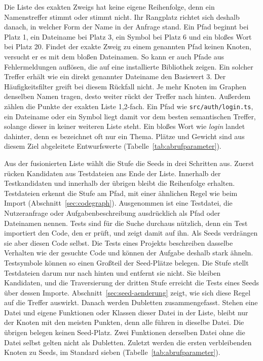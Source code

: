 Die Liste des exakten Zweigs hat keine eigene Reihenfolge, denn ein Namenstreffer stimmt oder stimmt nicht. Ihr Rangplatz richtet sich deshalb danach, in welcher Form der Name in der Anfrage stand. Ein Pfad beginnt bei Platz 1, ein Dateiname bei Platz 3, ein Symbol bei Platz 6 und ein bloßes Wort bei Platz 20. Findet der exakte Zweig zu einem genannten Pfad keinen Knoten, versucht er es mit dem bloßen Dateinamen. So kann er auch Pfade aus Fehlermeldungen auflösen, die auf eine installierte Bibliothek zeigen. Ein solcher Treffer erhält wie ein direkt genannter Dateiname den Basiswert 3. Der Häufigkeitsfilter greift bei diesem Rückfall nicht. Je mehr Knoten im Graphen denselben Namen tragen, desto weiter rückt der Treffer nach hinten. Außerdem zählen die Punkte der exakten Liste 1,2-fach. Ein Pfad wie \texttt{src/auth/login.ts}, ein Dateiname oder ein Symbol liegt damit vor dem besten semantischen Treffer, solange dieser in keiner weiteren Liste steht. Ein bloßes Wort wie \emph{login} landet dahinter, denn es bezeichnet oft nur ein Thema. Plätze und Gewicht sind aus diesem Ziel abgeleitete Entwurfswerte (Tabelle~\ref{tab:abrufparameter}).

Aus der fusionierten Liste wählt die Stufe die Seeds in drei Schritten aus. Zuerst rücken Kandidaten aus Testdateien ans Ende der Liste. Innerhalb der Testkandidaten und innerhalb der übrigen bleibt die Reihenfolge erhalten. Testdateien erkennt die Stufe am Pfad, mit einer ähnlichen Regel wie beim Import (Abschnitt~\ref{sec:codegraph}). Ausgenommen ist eine Testdatei, die Nutzeranfrage oder Aufgabenbeschreibung ausdrücklich als Pfad oder Dateinamen nennen. Tests sind für die Suche durchaus nützlich, denn ein Test importiert den Code, den er prüft, und zeigt damit auf ihn. Als Seeds verdrängen sie aber diesen Code selbst. Die Tests eines Projekts beschreiben dasselbe Verhalten wie der gesuchte Code und können der Aufgabe deshalb stark ähneln. Testsymbole können so einen Großteil der Seed-Plätze belegen. Die Stufe stellt Testdateien darum nur nach hinten und entfernt sie nicht. Sie bleiben Kandidaten, und die Traversierung der dritten Stufe erreicht die Tests eines Seeds über dessen Importe. Abschnitt~\ref{sec:seed-aenderung} zeigt, wie sich diese Regel auf die Treffer auswirkt. Danach werden Dubletten zusammengefasst. Stehen eine Datei und eigene Funktionen oder Klassen dieser Datei in der Liste, bleibt nur der Knoten mit den meisten Punkten, denn alle führen in dieselbe Datei. Die übrigen belegen keinen Seed-Platz. Zwei Funktionen derselben Datei ohne die Datei selbst gelten nicht als Dubletten. Zuletzt werden die ersten verbleibenden Knoten zu Seeds, im Standard sieben (Tabelle~\ref{tab:abrufparameter}).

